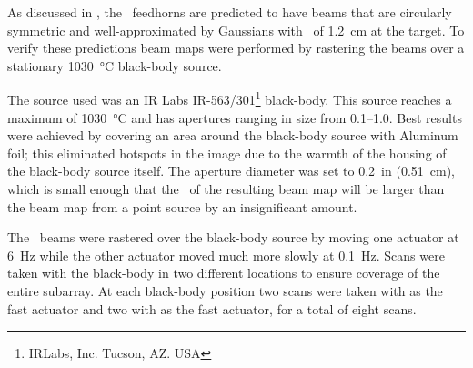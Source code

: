 As discussed in , the \Imager\ feedhorns are predicted to have beams that are circularly symmetric and well-approximated by Gaussians with \FWHM\ of \SI{1.2}{\cm} at the target.
To verify these predictions beam maps were performed by rastering the beams over a stationary \SI{1030}{\celsius} black-body source.

The source used was an IR Labs IR-563/301\footnote{IRLabs, Inc. Tucson, AZ. USA} black-body.
This source reaches a maximum of \SI{1030}{\celsius} and has apertures ranging in size from \SIrange{0.1}{1.0}{\in}. %
Best results were achieved by covering an area around the black-body source with Aluminum foil; this eliminated hotspots in the image due to the warmth of the housing of the black-body source itself.
The aperture diameter was set to \SI{0.2}{in} (\SI{0.51}{\cm}), which is small enough that the \FWHM\ of the resulting beam map will be larger than the beam map from a point source by an insignificant amount.

The \Imager\ beams were rastered over the black-body source by moving one actuator at \SI{6}{\hertz} while the other actuator moved much more slowly at \SI{0.1}{\hertz}.
Scans were taken with the black-body in two different locations to ensure coverage of the entire subarray.
At each black-body position two scans were taken with  as the fast actuator and two with  as the fast actuator, for a total of eight scans.

